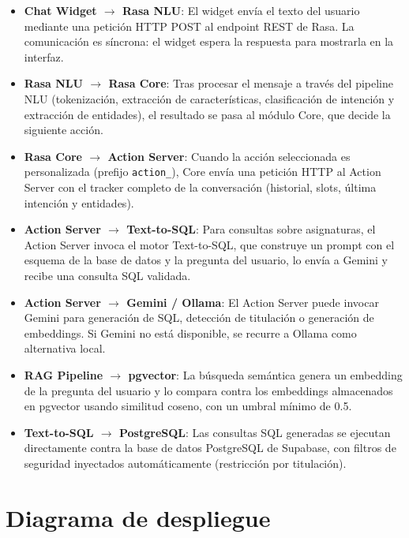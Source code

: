 \begin{itemize}
    \item \textbf{Chat Widget $\rightarrow$ Rasa NLU}: El widget envía el texto del usuario mediante una petición HTTP POST al endpoint REST de Rasa. La comunicación es síncrona: el widget espera la respuesta para mostrarla en la interfaz.
    \item \textbf{Rasa NLU $\rightarrow$ Rasa Core}: Tras procesar el mensaje a través del pipeline NLU (tokenización, extracción de características, clasificación de intención y extracción de entidades), el resultado se pasa al módulo Core, que decide la siguiente acción.
    \item \textbf{Rasa Core $\rightarrow$ Action Server}: Cuando la acción seleccionada es personalizada (prefijo \texttt{action\_}), Core envía una petición HTTP al Action Server con el tracker completo de la conversación (historial, slots, última intención y entidades).
    \item \textbf{Action Server $\rightarrow$ Text-to-SQL}: Para consultas sobre asignaturas, el Action Server invoca el motor Text-to-SQL, que construye un prompt con el esquema de la base de datos y la pregunta del usuario, lo envía a Gemini y recibe una consulta SQL validada.
    \item \textbf{Action Server $\rightarrow$ Gemini / Ollama}: El Action Server puede invocar Gemini para generación de SQL, detección de titulación o generación de embeddings. Si Gemini no está disponible, se recurre a Ollama como alternativa local.
    \item \textbf{RAG Pipeline $\rightarrow$ pgvector}: La búsqueda semántica genera un embedding de la pregunta del usuario y lo compara contra los embeddings almacenados en pgvector usando similitud coseno, con un umbral mínimo de 0.5.
    \item \textbf{Text-to-SQL $\rightarrow$ PostgreSQL}: Las consultas SQL generadas se ejecutan directamente contra la base de datos PostgreSQL de Supabase, con filtros de seguridad inyectados automáticamente (restricción por titulación).
\end{itemize}


\section{Diagrama de despliegue}\label{sec:diagrama-despliegue}

